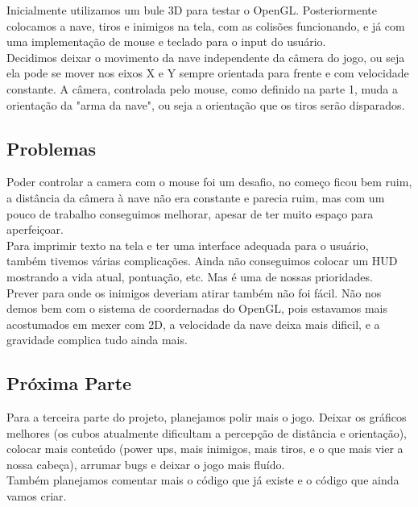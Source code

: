\documentclass[12pt,a4paper]{article}
\begin{document}
    		Inicialmente utilizamos um bule 3D para testar o OpenGL. Posteriormente colocamos a nave, tiros e inimigos
		na tela, com as colisões funcionando, e já com uma implementação de mouse e teclado para o input do usuário.\\
    		
    		Decidimos deixar o movimento da nave independente da câmera do jogo, ou seja ela pode se mover
		nos eixos X e Y sempre orientada para frente e com velocidade constante. A câmera, controlada pelo mouse,
		como definido na parte 1, muda a orientação da "arma da nave", ou seja a orientação que os tiros serão 				disparados.\\
		
		\subsection{Problemas}
		Poder controlar a camera com o mouse foi um desafio, no começo ficou bem ruim, a distância da câmera à nave
		não era constante e parecia ruim, mas com um pouco de trabalho conseguimos melhorar, apesar de ter muito 				espaço para aperfeiçoar. \\
    		
    		Para imprimir texto na tela e ter uma interface adequada para o usuário, também tivemos várias complicações.
    		Ainda não conseguimos colocar um HUD mostrando a vida atual, pontuação, etc. Mas é uma de nossas prioridades.\\
    		
    		Prever para onde os inimigos deveriam atirar também não foi fácil. Não nos demos bem com o sistema de 				coordernadas do OpenGL, pois estavamos mais acostumados em mexer com 2D, a velocidade da nave deixa mais 				dificil, e a gravidade complica tudo ainda mais.
		
		
		\subsection{Próxima Parte}
		Para a terceira parte do projeto, planejamos polir mais o jogo. Deixar os gráficos melhores (os cubos
		atualmente dificultam a percepção de distância e orientação), colocar mais conteúdo (power ups, mais 					inimigos, mais tiros, e o que mais vier a nossa cabeça), arrumar bugs e deixar o jogo mais fluído.\\
		
		Também planejamos comentar mais o código que já existe e o código que ainda vamos criar.
\end{document}
